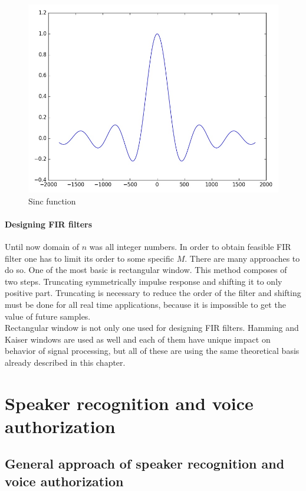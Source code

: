 \documentclass[magister]{dyplom}
\begin{document}
	\begin{figure}
		\centering
		\includegraphics[width=0.7\linewidth]{images/sinc}
		\caption{Sinc function}
		\label{fig:sinc}
	\end{figure}
	
	\subsubsection{Designing FIR filters}
	
	Until now domain of $n$ was all integer numbers. In order to obtain feasible FIR filter one has to limit its order to some specific $M$. There are many approaches to do so. One of the most basic is rectangular window. This method composes of two steps. Truncating symmetrically impulse response and shifting it to only positive part. Truncating is necessary to reduce the order of the filter and shifting must be done for all real time applications, because it is impossible to get the value of future samples. \\
	
	Rectangular window is not only one used for designing FIR filters. Hamming and Kaiser windows are used as well and each of them have unique impact on behavior of signal processing, but all of these are using the same theoretical basis already described in this chapter.
	
	\chapter{Speaker recognition and voice authorization} \label{ch:speaker_recognition}
	
	\section{General approach of speaker recognition and voice authorization}
	
\end{document}
